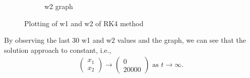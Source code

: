 \documentclass{article}
\begin{document}
\begin{enumerate}
\begin{figure}[h]
\begin{subfigure}{.5\textwidth}
            \centering
            \caption{w2 graph}
        \end{subfigure}
        \caption{Plotting of w1 and w2 of RK4 method}
        \label{fig:RK4_Method_w1_And_w2_Graph}
    \end{figure} By observing the last 30 w1 and w2 values and the graph, we can see that the solution approach to constant, i.e., \begin{align}
        \begin{pmatrix} 
            x_1 \\
            x_2
        \end{pmatrix}
        \rightarrow
        \begin{pmatrix} 
            0 \\
            20000
        \end{pmatrix}
        \text{ as } t \rightarrow \infty.
    \end{align}
\end{enumerate}
\end{document}
